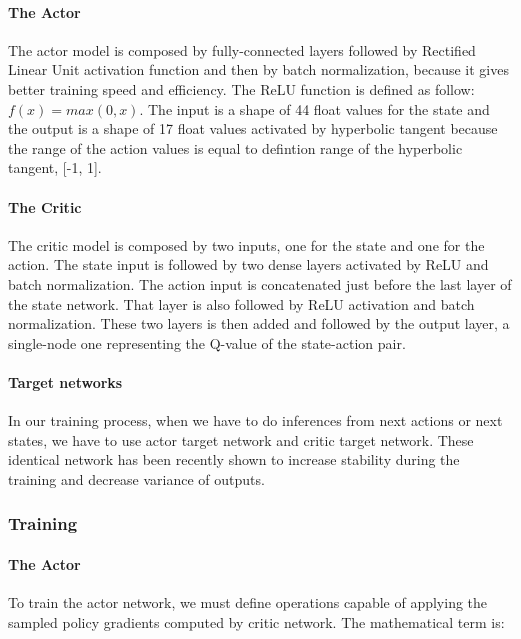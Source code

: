 \documentclass{article}
\begin{document}
\paragraph{The Actor}

The actor model is composed by fully-connected layers followed by Rectified
Linear Unit activation function and then by batch normalization, because it
gives better training speed and efficiency. The ReLU function is defined as
follow: $f(x) = max(0, x)$. 
The input is a shape of 44 float values for the state and the output is a shape
of 17 float values activated by hyperbolic tangent because the range of the
action values is equal to defintion range of the hyperbolic tangent, [-1, 1].

\paragraph{The Critic}

The critic model is composed by two inputs, one for the state and one for the
action. The state input is followed by two dense layers activated by ReLU
and batch normalization. The action input is concatenated just before the last layer
of the state network. That layer is also followed by ReLU activation and
batch normalization. These two layers is then added and followed by the output
layer, a single-node one representing the Q-value of the state-action pair.

\paragraph{Target networks}

In our training process, when we have to do inferences from next actions or next
states, we have to use actor target network and critic target network. These
identical network has been recently shown to increase stability during the
training and decrease variance of outputs.

\subsubsection{Training}

\paragraph{The Actor}

To train the actor network, we must define operations capable of applying the
sampled policy gradients computed by critic network. The mathematical term is:
\end{document}
